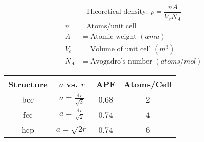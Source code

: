 \documentclass{equation-sheet}
\begin{document}
\begin{equation*}
    \text{Theoretical density: } \rho = \frac{nA}{V_c N_A} 
\end{equation*}
\cutspace
\begin{align*}
    n&= \text{Atoms/unit cell} \\
    A &= \text{Atomic weight }(amu) \\
    V_c &= \text{Volume of unit cell }(m^3) \\
    N_A &= \text{Avogadro's number }(atoms/mol)
\end{align*}

\begin{tabular}{|c|c|c|c|}
\hline
Structure & $a$ vs. $r$ & APF & Atoms/Cell \\
\hline
bcc & $a = \frac{4r}{\sqrt{3}}$ & 0.68 & 2 \\
\hline
fcc & $a = \frac{4r}{\sqrt{2}}$ & 0.74 & 4 \\
\hline
hcp & $a = \sqrt{2r}$ & 0.74 & 6 \\
\hline
\end{tabular}
\end{document}
